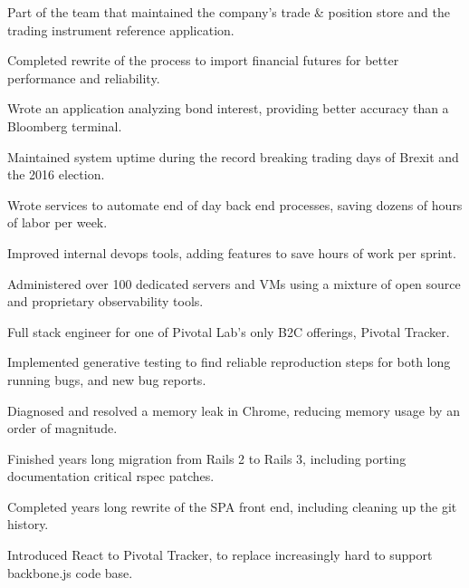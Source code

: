 \documentclass[]{deedy-resume-openfont}
\begin{document}
\vspace{\topsep}
\begin{tightemize}
\item Part of the team that maintained the company's trade \& position store and the trading instrument reference application.
\item Completed rewrite of the process to import financial futures for better performance and reliability.
\item Wrote an application analyzing bond interest, providing better accuracy than a Bloomberg terminal.
\item Maintained system uptime during the record breaking trading days of Brexit and the 2016 election.
\item Wrote services to automate end of day back end processes, saving dozens of hours of labor per week.
\item Improved internal devops tools, adding features to save hours of work per sprint.
\item Administered over 100 dedicated servers and VMs using a mixture of open source and proprietary observability tools.
\end{tightemize}
\sectionsep

\vspace{\topsep}
Full stack engineer for one of Pivotal Lab's only B2C offerings, Pivotal Tracker.
\vspace{\topsep}
\begin{tightemize}
\item Implemented generative testing to find reliable reproduction steps for both long running bugs, and new bug reports.
\item Diagnosed and resolved a memory leak in Chrome, reducing memory usage by an order of magnitude.
\item Finished years long migration from Rails 2 to Rails 3, including porting documentation critical rspec patches.
\item Completed years long rewrite of the SPA front end, including cleaning up the git history.
\item Introduced React to Pivotal Tracker, to replace increasingly hard to support backbone.js code base.
\end{tightemize}
\end{document}
